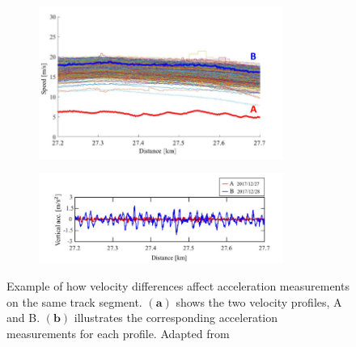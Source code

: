 \begin{figure}[H]
    \centering
    \begin{subfigure}{0.45\textwidth}
        \includegraphics[width=8cm]{Cap2_LitReview/Vel_effect/vel_profiles.png}
        \caption{}
        \label{fig:vel_effect_ono-a}
    \end{subfigure}
    \hspace{0.3cm}
    \begin{subfigure}{0.45\textwidth}
        \includegraphics[width=8cm]{Cap2_LitReview/Vel_effect/accel_measurements.png}
        \caption{}
        \label{fig:vel_effect_ono-b}
    \end{subfigure}
    \caption{Example of how velocity differences affect acceleration measurements on the same track segment. $\boldsymbol{(a)}$ shows the two velocity profiles, A and B. $\boldsymbol{(b)}$ illustrates the corresponding acceleration measurements for each profile. Adapted from \cite{Hironori_ONO202322-00239}}
    \label{fig:vel_effect_ono}
\end{figure}

